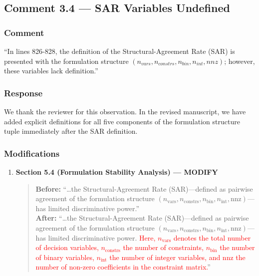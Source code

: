 \documentclass[11pt,a4paper]{article}
\begin{document}
\subsection{Comment 3.4 --- SAR Variables Undefined}

\subsubsection{Comment}
``In lines 826-828, the definition of the Structural-Agreement Rate (SAR) is presented with the formulation structure $(n_{vars}, n_{constrs}, n_{bin}, n_{int}, nnz)$; however, these variables lack definition.''

\subsubsection{Response}
We thank the reviewer for this observation. In the revised manuscript, we have added explicit definitions for all five components of the formulation structure tuple immediately after the SAR definition.

\subsubsection{Modifications}
\begin{enumerate}
\item \textbf{Section 5.4 (Formulation Stability Analysis) --- MODIFY}
\begin{quote}
\textbf{Before:} ``\ldots the Structural-Agreement Rate (SAR)---defined as pairwise agreement of the formulation structure $(n_{\text{vars}}, n_{\text{constrs}}, n_{\text{bin}}, n_{\text{int}}, \text{nnz})$---has limited discriminative power.''\\[4pt]
\textbf{After:} ``\ldots the Structural-Agreement Rate (SAR)---defined as pairwise agreement of the formulation structure $(n_{\text{vars}}, n_{\text{constrs}}, n_{\text{bin}}, n_{\text{int}}, \text{nnz})$---has limited discriminative power. \textcolor{red}{Here, $n_{\text{vars}}$ denotes the total number of decision variables, $n_{\text{constrs}}$ the number of constraints, $n_{\text{bin}}$ the number of binary variables, $n_{\text{int}}$ the number of integer variables, and nnz the number of non-zero coefficients in the constraint matrix.}''
\end{quote}
\end{enumerate}
\end{document}
